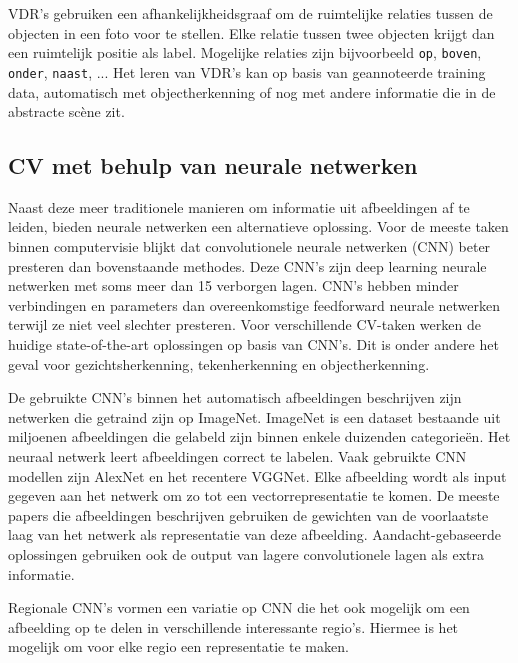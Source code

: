 VDR's gebruiken een afhankelijkheidsgraaf om de ruimtelijke relaties tussen de objecten in een foto voor te stellen. Elke relatie tussen twee objecten krijgt dan een ruimtelijk positie als label. Mogelijke relaties zijn bijvoorbeeld \texttt{op}, \texttt{boven}, \texttt{onder}, \texttt{naast}, ... Het leren van VDR's kan op basis van geannoteerde training data, automatisch met objectherkenning\cite{Elliott2015} of nog met andere informatie die in de abstracte sc\`ene zit\cite{Gilberto2015}.  

\subsection{CV met behulp van neurale netwerken}
Naast deze meer traditionele manieren om informatie uit afbeeldingen af te leiden, bieden neurale netwerken een alternatieve oplossing.
Voor de meeste taken binnen computervisie blijkt dat convolutionele neurale netwerken (CNN) beter presteren dan bovenstaande methodes. Deze CNN's zijn deep learning neurale netwerken met soms meer dan 15 verborgen lagen. CNN's hebben minder verbindingen en parameters dan overeenkomstige feedforward neurale netwerken terwijl ze niet veel slechter presteren\cite{Krizhevsky2012a}. 
Voor verschillende CV-taken werken de huidige state-of-the-art oplossingen op basis van CNN's. Dit is onder andere het geval voor gezichtsherkenning\cite{Zhou2015}, tekenherkenning\cite{Ciresan2012} en objectherkenning\cite{Szegedy2014}.

De gebruikte CNN's binnen het automatisch afbeeldingen beschrijven zijn netwerken die getraind zijn op ImageNet\cite{Russakovsky2014}. ImageNet is een dataset bestaande uit miljoenen afbeeldingen die gelabeld zijn binnen enkele duizenden categorie\"en. Het neuraal netwerk leert afbeeldingen correct te labelen. Vaak gebruikte CNN modellen zijn AlexNet\cite{Krizhevsky2012a} en het recentere VGGNet\cite{Arge2015}. Elke afbeelding wordt als input gegeven aan het netwerk om zo tot een vectorrepresentatie te komen. De meeste papers die afbeeldingen beschrijven gebruiken de gewichten van de voorlaatste laag van het netwerk als representatie van deze afbeelding\cite{Chen2014,Karpathy2015,Mao2014a,Google}. Aandacht-gebaseerde oplossingen\cite{Jin2015,Xu2015} gebruiken ook de output van lagere convolutionele lagen als extra informatie.

Regionale CNN's vormen een variatie op CNN die het ook mogelijk om een afbeelding op te delen in verschillende interessante regio's. Hiermee is het mogelijk om voor elke regio een representatie te maken\cite{Karpathy2015,Mitchell2015}. 

